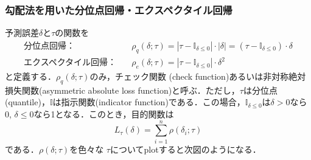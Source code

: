 \subsubsection{勾配法を用いた分位点回帰・エクスペクタイル回帰}予測誤差$\delta$と$\tau$の関数を
$$
\begin{align}
\text{分位点回帰：}&\quad
\rho_q(\delta; \tau)=\left|\tau-\mathbb{I}_{\delta \leq 0}\right|\cdot |\delta|=\left(\tau-\mathbb{I}_{\delta \leq 0}\right)\cdot \delta\\
\text{エクスペクタイル回帰：}&\quad
\rho_e(\delta; \tau)=\left|\tau-\mathbb{I}_{\delta \leq 0}\right|\cdot \delta^2
\end{align}
$$
と定義する．$\rho_q(\delta; \tau)$のみ，チェック関数 (check function)あるいは非対称絶対損失関数(asymmetric absolute loss function)と呼ぶ．ただし，$\tau$は分位点(quantile)，$\mathbb{I}$は指示関数(indicator function)である．この場合，$\mathbb{I}_{\delta \leq 0}$は$\delta \gt 0$なら0, $\delta \leq 0$なら1となる．このとき，目的関数は 
$$
L_{\tau}(\delta)
=\sum_{i=1}^n \rho(\delta_i; \tau)
$$
である．$\rho(\delta; \tau)$を色々な $\tau$についてplotすると次図のようになる．
